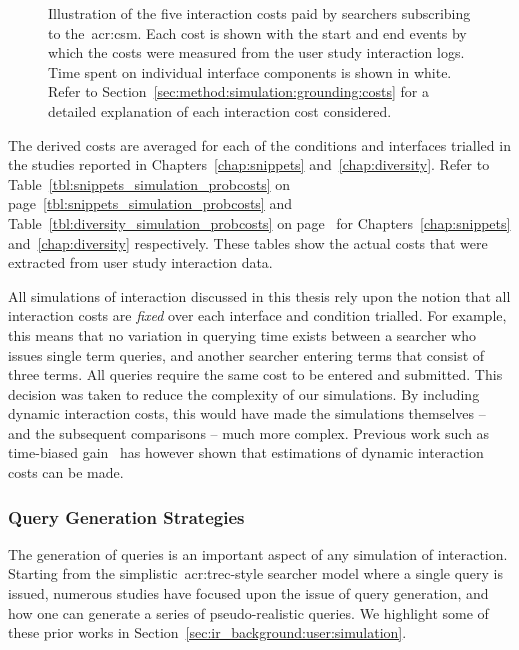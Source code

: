 \begin{figure}[t!]
    \centering
    \caption[Interaction costs illustrated throughout a search session]{Illustration of the five interaction costs paid by searchers subscribing to the~\gls{acr:csm}. Each cost is shown with the start and end events by which the costs were measured from the user study interaction logs. Time spent on individual interface components is shown in white. Refer to Section~\ref{sec:method:simulation:grounding:costs} for a detailed explanation of each interaction cost considered.}
    \label{fig:costs}
\end{figure}

The derived costs are averaged for each of the conditions and interfaces trialled in the studies reported in Chapters~\ref{chap:snippets} and~\ref{chap:diversity}. Refer to Table~\ref{tbl:snippets_simulation_probcosts} on page~\ref{tbl:snippets_simulation_probcosts} and Table~\ref{tbl:diversity_simulation_probcosts} on page~\pageref{tbl:diversity_simulation_probcosts} for Chapters~\ref{chap:snippets} and~\ref{chap:diversity} respectively. These tables show the actual costs that were extracted from user study interaction data.

All simulations of interaction discussed in this thesis rely upon the notion that all interaction costs are \emph{fixed} over each interface and condition trialled. For example, this means that no variation in querying time exists between a searcher who issues single term queries, and another searcher entering terms that consist of three terms. All queries require the same cost to be entered and submitted. This decision was taken to reduce the complexity of our simulations. By including dynamic interaction costs, this would have made the simulations themselves -- and the subsequent comparisons -- much more complex. Previous work such as time-biased gain~\citep{smucker2012tbg} has however shown that estimations of dynamic interaction costs can be made.

\subsubsection{Query Generation Strategies}\label{sec:method:simulation:grounding:querying}
The generation of queries is an important aspect of any simulation of interaction. Starting from the simplistic~\gls{acr:trec}-style searcher model where a single query is issued, numerous studies have focused upon the issue of query generation, and how one can generate a series of pseudo-realistic queries. We highlight some of these prior works in Section~\ref{sec:ir_background:user:simulation}.

